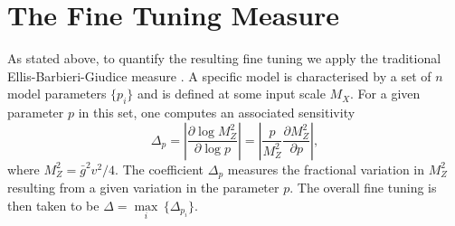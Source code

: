 \documentclass[preprint,amsmath,amssymb,aps,superscriptaddress,prd,showpacs,floatfix,nofootinbib]{revtex4-1}
\begin{document}
\section{\label{sec:tuningmeasure}The Fine Tuning Measure}
As stated above, to quantify the resulting fine tuning we
apply the traditional Ellis-Barbieri-Giudice measure
\cite{Ellis:1986yg,Barbieri:1987fn}. A specific model is characterised
by a set of $n$ model parameters $\{p_i\}$ and is defined at some
input scale $M_X$. For a given parameter $p$ in this set, one computes
an associated sensitivity
\begin{equation}\label{eq:bgmeasure}
\Delta_p=\left | \frac{\partial \log M_Z^2}{\partial \log p}\right
|=\left | \frac{p}{M_Z^2}\frac{\partial M_Z^2}{\partial p}\right |,
\end{equation}
where $M_Z^2=\bar{g}^2v^2/4$. The coefficient $\Delta_p$ measures the
fractional variation in $M_Z^2$ resulting from a given variation in
the parameter $p$. The overall fine tuning is then taken to be $\Delta
= \underset{i}{\max}\,\{\Delta_{p_i}\}$.\\
\end{document}
